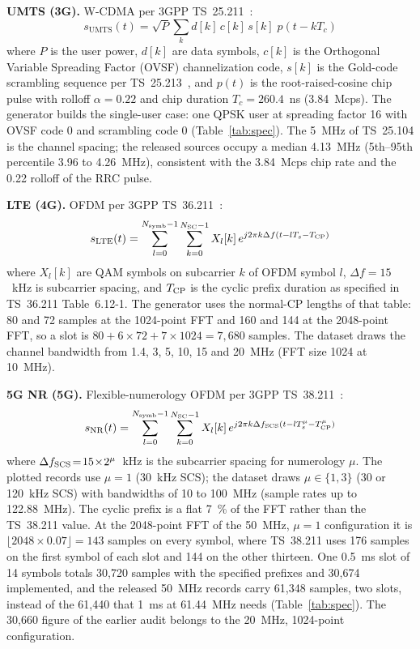 \documentclass[journal]{IEEEtran}
\begin{document}
\textbf{UMTS (3G).} W-CDMA per 3GPP TS~25.211~\cite{3gpp25211}:
\begin{equation}
s_{\text{UMTS}}(t) = \sqrt{P} \sum_k d[k]\, c[k]\, s[k]\; p(t - kT_c)
\label{eq:umts}
\end{equation}
where $P$ is the user power, $d[k]$ are data symbols, $c[k]$ is the Orthogonal
Variable Spreading Factor (OVSF) channelization code, $s[k]$ is the Gold-code
scrambling sequence per TS~25.213~\cite{3gpp25213}, and $p(t)$ is the
root-raised-cosine chip pulse with rolloff $\alpha\!=\!0.22$ and chip duration
$T_c\!=\!260.4$~ns (3.84~Mcps). The generator builds the single-user case: one
QPSK user at spreading factor 16 with OVSF code 0 and scrambling code 0
(Table~\ref{tab:spec}). The 5~MHz of TS~25.104 is the channel spacing; the
released sources occupy a median 4.13~MHz (5th--95th percentile 3.96 to
4.26~MHz), consistent with the 3.84~Mcps chip rate and the 0.22 rolloff of the
RRC pulse.

\textbf{LTE (4G).} OFDM per 3GPP TS~36.211~\cite{3gpp36211}:
\begin{equation}
s_{\text{LTE}}(t) = \sum_{l=0}^{N_{\rm symb}-1}
  \sum_{k=0}^{N_{\rm SC}-1} X_l[k]\,
  e^{j2\pi k\Delta f(t - lT_s - T_{\rm CP})}
\label{eq:lte}
\end{equation}
where $X_l[k]$ are QAM symbols on subcarrier $k$ of OFDM symbol $l$,
$\Delta f\!=\!15$~kHz is subcarrier spacing, and $T_{\rm CP}$ is the cyclic
prefix duration as specified in TS~36.211 Table~6.12-1. The generator uses the
normal-CP lengths of that table: 80 and 72 samples at the 1024-point FFT and 160
and 144 at the 2048-point FFT, so a slot is $80 + 6\times72 + 7\times1024 =
7{,}680$ samples. The dataset draws the channel
bandwidth from 1.4, 3, 5, 10, 15 and 20~MHz (FFT size 1024 at 10~MHz).

\textbf{5G NR (5G).} Flexible-numerology OFDM per 3GPP
TS~38.211~\cite{3gpp38211}:
\begin{equation}
s_{\rm NR}(t) = \sum_{l=0}^{N_{\rm symb}-1}
  \sum_{k=0}^{N_{\rm SC}-1} X_l[k]\,
  e^{j2\pi k\Delta f_{\rm SCS}(t - lT_s^\mu - T_{\rm CP}^\mu)}
\label{eq:nr}
\end{equation}
where $\Delta f_{\rm SCS}\!=\!15\!\times\!2^\mu$~kHz is the subcarrier
spacing for numerology $\mu$. The plotted records use $\mu\!=\!1$ (30~kHz SCS);
the dataset draws $\mu \in \{1,3\}$ (30 or 120~kHz SCS) with bandwidths of 10 to
100~MHz (sample rates up to 122.88~MHz). The cyclic prefix is a flat 7~\% of the
FFT rather than the TS~38.211 value. At the 2048-point FFT of the 50~MHz,
$\mu\!=\!1$ configuration it is $\lfloor 2048\times0.07\rfloor = 143$ samples on
every symbol, where TS~38.211 uses 176 samples on the first symbol of each slot
and 144 on the other thirteen. One 0.5~ms slot of 14 symbols totals 30,720
samples with the specified prefixes and 30,674 implemented, and the released
50~MHz records carry 61,348 samples, two slots, instead of the 61,440 that 1~ms
at 61.44~MHz needs (Table~\ref{tab:spec}). The 30,660 figure of the earlier
audit belongs to the 20~MHz, 1024-point configuration.
\end{document}
